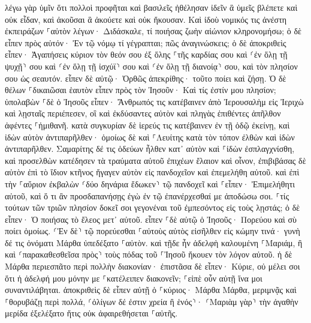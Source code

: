 \documentclass[twoside, 9pt]{extreport}
\begin{document}
λέγω γὰρ ὑμῖν ὅτι πολλοὶ προφῆται καὶ βασιλεῖς ἠθέλησαν ἰδεῖν ἃ ὑμεῖς βλέπετε καὶ οὐκ εἶδαν, καὶ ἀκοῦσαι ἃ ἀκούετε καὶ οὐκ ἤκουσαν. 
Καὶ ἰδοὺ νομικός τις ἀνέστη ἐκπειράζων ⸀αὐτὸν λέγων· Διδάσκαλε, τί ποιήσας ζωὴν αἰώνιον κληρονομήσω; 
ὁ δὲ εἶπεν πρὸς αὐτόν· Ἐν τῷ νόμῳ τί γέγραπται; πῶς ἀναγινώσκεις; 
ὁ δὲ ἀποκριθεὶς εἶπεν· Ἀγαπήσεις κύριον τὸν θεόν σου ἐξ ὅλης ⸀τῆς καρδίας σου καὶ ⸂ἐν ὅλῃ τῇ ψυχῇ⸃ σου καὶ ⸂ἐν ὅλῃ τῇ ἰσχύϊ⸃ σου καὶ ⸂ἐν ὅλῃ τῇ διανοίᾳ⸃ σου, καὶ τὸν πλησίον σου ὡς σεαυτόν. 
εἶπεν δὲ αὐτῷ· Ὀρθῶς ἀπεκρίθης· τοῦτο ποίει καὶ ζήσῃ. 
Ὁ δὲ θέλων ⸀δικαιῶσαι ἑαυτὸν εἶπεν πρὸς τὸν Ἰησοῦν· Καὶ τίς ἐστίν μου πλησίον; 
ὑπολαβὼν ⸀δὲ ὁ Ἰησοῦς εἶπεν· Ἄνθρωπός τις κατέβαινεν ἀπὸ Ἰερουσαλὴμ εἰς Ἰεριχὼ καὶ λῃσταῖς περιέπεσεν, οἳ καὶ ἐκδύσαντες αὐτὸν καὶ πληγὰς ἐπιθέντες ἀπῆλθον ἀφέντες ⸀ἡμιθανῆ. 
κατὰ συγκυρίαν δὲ ἱερεύς τις κατέβαινεν ἐν τῇ ὁδῷ ἐκείνῃ, καὶ ἰδὼν αὐτὸν ἀντιπαρῆλθεν· 
ὁμοίως δὲ καὶ ⸀Λευίτης κατὰ τὸν τόπον ἐλθὼν καὶ ἰδὼν ἀντιπαρῆλθεν. 
Σαμαρίτης δέ τις ὁδεύων ἦλθεν κατ᾽ αὐτὸν καὶ ⸀ἰδὼν ἐσπλαγχνίσθη, 
καὶ προσελθὼν κατέδησεν τὰ τραύματα αὐτοῦ ἐπιχέων ἔλαιον καὶ οἶνον, ἐπιβιβάσας δὲ αὐτὸν ἐπὶ τὸ ἴδιον κτῆνος ἤγαγεν αὐτὸν εἰς πανδοχεῖον καὶ ἐπεμελήθη αὐτοῦ. 
καὶ ἐπὶ τὴν ⸀αὔριον ἐκβαλὼν ⸂δύο δηνάρια ἔδωκεν⸃ τῷ πανδοχεῖ καὶ ⸀εἶπεν· Ἐπιμελήθητι αὐτοῦ, καὶ ὅ τι ἂν προσδαπανήσῃς ἐγὼ ἐν τῷ ἐπανέρχεσθαί με ἀποδώσω σοι. 
⸀τίς τούτων τῶν τριῶν πλησίον δοκεῖ σοι γεγονέναι τοῦ ἐμπεσόντος εἰς τοὺς λῃστάς; 
ὁ δὲ εἶπεν· Ὁ ποιήσας τὸ ἔλεος μετ᾽ αὐτοῦ. εἶπεν ⸀δὲ αὐτῷ ὁ Ἰησοῦς· Πορεύου καὶ σὺ ποίει ὁμοίως. 
⸂Ἐν δὲ⸃ τῷ πορεύεσθαι ⸀αὐτοὺς αὐτὸς εἰσῆλθεν εἰς κώμην τινά· γυνὴ δέ τις ὀνόματι Μάρθα ὑπεδέξατο ⸀αὐτὸν. 
καὶ τῇδε ἦν ἀδελφὴ καλουμένη ⸀Μαριάμ, ἣ καὶ ⸂παρακαθεσθεῖσα πρὸς⸃ τοὺς πόδας τοῦ ⸀Ἰησοῦ ἤκουεν τὸν λόγον αὐτοῦ. 
ἡ δὲ Μάρθα περιεσπᾶτο περὶ πολλὴν διακονίαν· ἐπιστᾶσα δὲ εἶπεν· Κύριε, οὐ μέλει σοι ὅτι ἡ ἀδελφή μου μόνην με ⸀κατέλειπεν διακονεῖν; ⸀εἰπὲ οὖν αὐτῇ ἵνα μοι συναντιλάβηται. 
ἀποκριθεὶς δὲ εἶπεν αὐτῇ ὁ ⸀κύριος· Μάρθα Μάρθα, μεριμνᾷς καὶ ⸀θορυβάζῃ περὶ πολλά, 
⸂ὀλίγων δέ ἐστιν χρεία ἢ ἑνός⸃· ⸂Μαριὰμ γὰρ⸃ τὴν ἀγαθὴν μερίδα ἐξελέξατο ἥτις οὐκ ἀφαιρεθήσεται ⸀αὐτῆς. 
\end{document}
